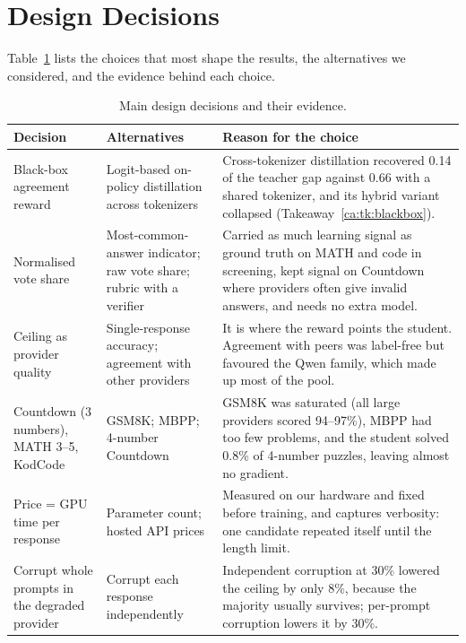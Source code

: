 \section{Design Decisions}
\label{ca:sec:decisions}

Table~\ref{ca:tab:decisions} lists the choices that most shape the results, the
alternatives we considered, and the evidence behind each choice.

\begin{table}[htbp]
\centering
\footnotesize
\renewcommand{\arraystretch}{1.1}
\begin{tabular}{@{}>{\raggedright\arraybackslash}p{2.7cm}
                >{\raggedright\arraybackslash}p{3.9cm}
                >{\raggedright\arraybackslash}p{8.3cm}@{}}
\toprule
\textbf{Decision} & \textbf{Alternatives} & \textbf{Reason for the choice} \\
\midrule
Black-box agreement reward & Logit-based on-policy distillation across tokenizers &
  Cross-tokenizer distillation recovered 0.14 of the teacher gap against 0.66 with a shared
  tokenizer, and its hybrid variant collapsed (Takeaway~\ref{ca:tk:blackbox}). \\
Normalised vote share & Most-common-answer indicator; raw vote share; rubric with a verifier &
  Carried as much learning signal as ground truth on MATH and code in screening, kept signal
  on Countdown where providers often give invalid answers, and needs no extra model. \\
Ceiling as provider quality & Single-response accuracy; agreement with other providers &
  It is where the reward points the student. Agreement with peers was label-free but
  favoured the Qwen family, which made up most of the pool. \\
Countdown (3 numbers), MATH 3--5, KodCode & GSM8K; MBPP; 4-number Countdown &
  GSM8K was saturated (all large providers scored 94--97\%), MBPP had too few problems, and
  the student solved 0.8\% of 4-number puzzles, leaving almost no gradient. \\
Price = GPU time per response & Parameter count; hosted API prices &
  Measured on our hardware and fixed before training, and captures verbosity: one candidate
  repeated itself until the length limit. \\
Corrupt whole prompts in the degraded provider & Corrupt each response independently &
  Independent corruption at 30\% lowered the ceiling by only 8\%, because the majority
  usually survives; per-prompt corruption lowers it by 30\%. \\
\bottomrule
\end{tabular}
\caption{Main design decisions and their evidence.}
\label{ca:tab:decisions}
\end{table}
